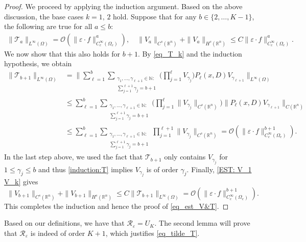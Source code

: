 \documentclass [oneside,11pt] {amsart}
\numberwithin{equation}{section}
\newcommand{\R}{\mathbb{R}}
\begin{document}
\begin{proof}
We proceed by applying the induction argument. Based on the above discussion, the base cases $k=1,\,2$ hold. Suppose that for any $b\in \{2,\ldots, K-1\}$, the following are true for all $a \leq b$:
\begin{align}\label{induction:T}
\| \mathcal{T}_{a}\|_{L^\infty(\Omega)}= \mathcal{O}(\|\varepsilon \cdot f\|^{a}_{C^\infty_c(\Omega_e)}),\quad \|V_{a}\|_{C^s(\R^n)}+\|V_a\|_{H^s(\R^n)}
\le  C\|\varepsilon \cdot f\|^{a}_{C^\infty_c(\Omega_e)}.
\end{align} 
We now show that this also holds for $b+1$. By \eqref{eq_T_k} and the induction hypothesis, we obtain  
\begin{align*}
\|\mathcal{T}_{b+1}\|_{L^\infty(\Omega)} &= \|\sum^{b}_{\ell=1} \sum_{\substack{ \gamma_1,\ldots, \gamma_{\ell+1}\in \mathbb{N} : \\ \sum_{j=1}^{\ell+1}\gamma_j = b+1 }}  \bigg( \prod_{j=1}^\ell V_{\gamma_j} \bigg)    P_\ell(x,D)V_{\gamma_{\ell+1}}\|_{L^\infty(\Omega)}\\
& \le \sum^{b}_{\ell=1} \sum_{\substack{ \gamma_1,\ldots, \gamma_{\ell+1}\in \mathbb{N} : \\ \sum_{j=1}^{\ell+1}\gamma_j = b+1 }}  \bigg( \prod_{j=1}^\ell \|V_{\gamma_j}\|_{C^s(\R^n)} \bigg)    \|P_\ell(x,D)V_{\gamma_{\ell+1}}\|_{C(\R^n)}\\
& \le \sum^{b}_{\ell=1} \sum_{\substack{ \gamma_1,\ldots, \gamma_{\ell+1}\in \mathbb{N} : \\ \sum_{j=1}^{\ell+1}\gamma_j = b+1 }}   \prod_{j=1}^{\ell+1} \|V_{\gamma_j}\|_{C^s(\R^n)}  = \mathcal{O}(\|\varepsilon\cdot f\|^{b+1}_{C_c^\infty(\Omega_e)}).
\end{align*}
In the last step above, we used the fact that $\mathcal{T}_{b+1}$ only contains $V_{\gamma_j}$ for $1\le\gamma_j\le b$ and thus \eqref{induction:T} implies $V_{\gamma_j}$ is of order $\gamma_j$. Finally, \eqref{EST: V_1 V_k} gives  
\[
\|V_{b+1}\|_{C^{s}(\R^n)} +\|V_{b+1}\|_{H^s(\R^n)}\le C\|\mathcal{T}_{b+1}\|_{L^\infty(\Omega)}= \mathcal{O}(\|\varepsilon\cdot f\|^{b+1}_{C_c^\infty(\Omega_e)}). 
\]
This completes the induction and hence the proof of \eqref{eq_est_V&T}.
\end{proof}


Based on our definitions, we have that $\mathcal{R}_\varepsilon=U_K$. The second lemma will prove that $\mathcal{R}_\varepsilon$ is indeed of order $K+1$, which justifies \eqref{eq_tilde_T}.
\end{document}
